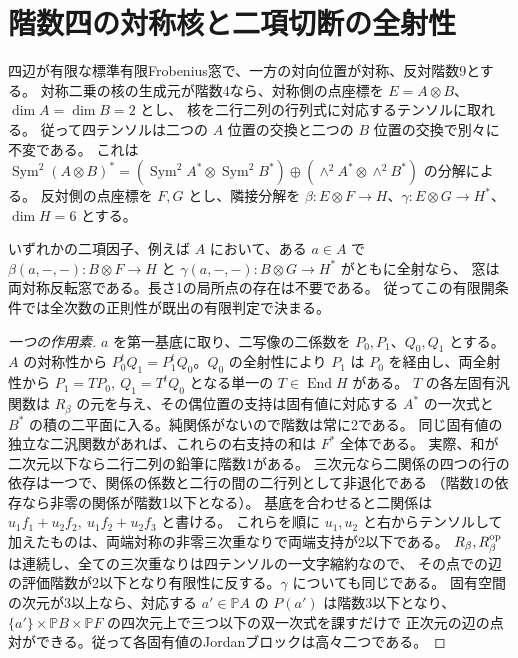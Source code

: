 \section{階数四の対称核と二項切断の全射性}
\label{sec:smooth-kernel-binary-transfer}
四辺が有限な標準有限Frobenius窓で、一方の対向位置が対称、反対階数9とする。
対称二乗の核の生成元が階数4なら、対称側の点座標を $E=A\otimes B$、$\dim A=\dim B=2$ とし、
核を二行二列の行列式に対応するテンソルに取れる。
従って四テンソルは二つの $A$ 位置の交換と二つの $B$ 位置の交換で別々に不変である。
これは $\operatorname{Sym}^2(A\otimes B)^*=
(\operatorname{Sym}^2 A^*\otimes\operatorname{Sym}^2 B^*)\oplus
(\wedge^2 A^*\otimes\wedge^2 B^*)$ の分解による。
反対側の点座標を $F,G$ とし、隣接分解を $\beta:E\otimes F\to H$、$\gamma:E\otimes G\to H^*$、$\dim H=6$ とする。
\begin{theorem}\label{thm:smooth-kernel-binary-transfer}
いずれかの二項因子、例えば $A$ において、ある $a\in A$ で
$\beta(a,-,-):B\otimes F\to H$ と $\gamma(a,-,-):B\otimes G\to H^*$ がともに全射なら、
窓は両対称反転窓である。長さ1の局所点の存在は不要である。
従ってこの有限開条件では全次数の正則性が既出の有限判定で決まる。
\end{theorem}
\begin{proof}[一つの作用素]
$a$ を第一基底に取り、二写像の二係数を $P_0,P_1$、$Q_0,Q_1$ とする。
$A$ の対称性から $P_0^t Q_1=P_1^t Q_0$。$Q_0$ の全射性により $P_1$ は
$P_0$ を経由し、両全射性から $P_1=T P_0,\ Q_1=T^t Q_0$ となる単一の $T\in\operatorname{End} H$ がある。
$T$ の各左固有汎関数は $R_\beta$ の元を与え、その偶位置の支持は固有値に対応する
$A^*$ の一次式と $B^*$ の積の二平面に入る。純関係がないので階数は常に2である。
同じ固有値の独立な二汎関数があれば、これらの右支持の和は $F^*$ 全体である。
実際、和が二次元以下なら二行二列の鉛筆に階数1がある。
三次元なら二関係の四つの行の依存は一つで、関係の係数と二行の間の二行列として非退化である
（階数1の依存なら非零の関係が階数1以下となる）。
基底を合わせると二関係は $u_1f_1+u_2f_2,\ u_1f_2+u_2f_3$ と書ける。
これらを順に $u_1,u_2$ と右からテンソルして加えたものは、両端対称の非零三次重なりで両端支持が2以下である。
$R_\beta,R_\beta^{\rm op}$ は連続し、全ての三次重なりは四テンソルの一文字縮約なので、
その点での辺の評価階数が2以下となり有限性に反する。$\gamma$ についても同じである。
固有空間の次元が3以上なら、対応する $a'\in\mathbb P A$ の $P(a')$ は階数3以下となり、
$\{a'\}\times\mathbb P B\times\mathbb P F$ の四次元上で三つ以下の双一次式を課すだけで
正次元の辺の点対ができる。従って各固有値のJordanブロックは高々二つである。
\end{proof}

